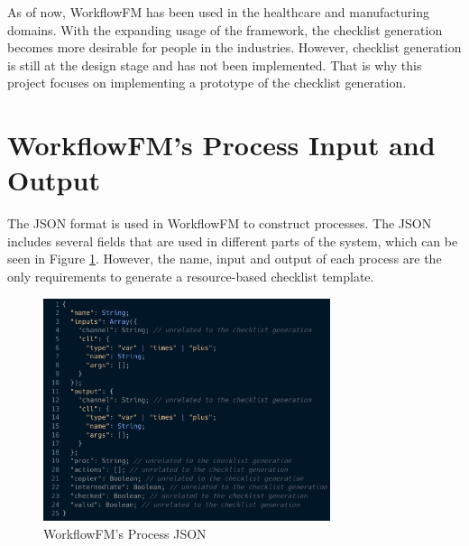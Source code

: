 As of now, WorkflowFM has been used in the healthcare and manufacturing domains. With the expanding usage of the framework, the checklist generation becomes more desirable for people in the industries. However, checklist generation is still at the design stage and has not been implemented. That is why this project focuses on implementing a prototype of the checklist generation.


\section{WorkflowFM's Process Input and Output}
\label{background:input_output}

The JSON format \cite{json} is used in WorkflowFM to construct processes. The JSON includes several fields that are used in different parts of the system, which can be seen in Figure \ref{fig:workflowfm_json}. However, the name, input and output of each process are the only requirements to generate a resource-based checklist template.

\begin{figure}[ht!]
    \centering
    \includegraphics[width=0.75\textwidth]{overleaf/images/workflowfm_json.png}
    \caption{WorkflowFM's Process JSON}
    \label{fig:workflowfm_json}
\end{figure}


